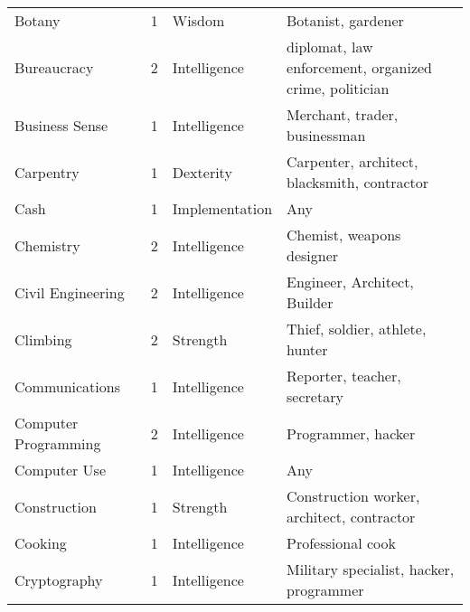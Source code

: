 \documentclass[twoside]{book}
\begin{document}
\begin{longtable}{p{1.25in}llp{12em}}
  \raggedright
           Botany 
  &
   1 
  &
   Wisdom 
  &
   Botanist, gardener
           
  \tabularnewline
      
  \raggedright
           Bureaucracy 
  &
   2 
  &
   Intelligence 
  &
   diplomat, law
           enforcement, organized crime, politician 
  \tabularnewline
      
  \raggedright
           Business Sense 
  &
   1 
  &
   Intelligence 
  &
   Merchant, trader,
           businessman 
  \tabularnewline
      
  \raggedright
           Carpentry 
  &
   1 
  &
   Dexterity 
  &
   Carpenter, architect,
           blacksmith, contractor 
  \tabularnewline
      
  \raggedright
           Cash 
  &
   1 
  &
   Implementation 
  &
   Any 
  \tabularnewline
      
  \raggedright
           Chemistry 
  &
   2 
  &
   Intelligence 
  &
   Chemist, weapons designer
           
  \tabularnewline
      
  \raggedright
           Civil Engineering 
  &
   2 
  &
   Intelligence 
  &
   Engineer, Architect,
           Builder 
  \tabularnewline
      
  \raggedright
           Climbing 
  &
   2 
  &
   Strength 
  &
   Thief, soldier, athlete,
           hunter 
  \tabularnewline
      
  \raggedright
           Communications 
  &
   1 
  &
   Intelligence 
  &
   Reporter, teacher,
           secretary 
  \tabularnewline
      
  \raggedright
           Computer Programming 
  &
   2 
  &
   Intelligence 
  &
   Programmer, hacker
           
  \tabularnewline
      
  \raggedright
           Computer Use 
  &
   1 
  &
   Intelligence 
  &
   Any 
  \tabularnewline
      
  \raggedright
           Construction 
  &
   1 
  &
   Strength 
  &
   Construction worker,
           architect, contractor 
  \tabularnewline
      
  \raggedright
           Cooking 
  &
   1 
  &
   Intelligence 
  &
   Professional cook
           
  \tabularnewline
      
  \raggedright
           Cryptography 
  &
   1 
  &
   Intelligence 
  &
   Military specialist,
           hacker, programmer 
  \tabularnewline
      

\end{longtable}
\end{document}
